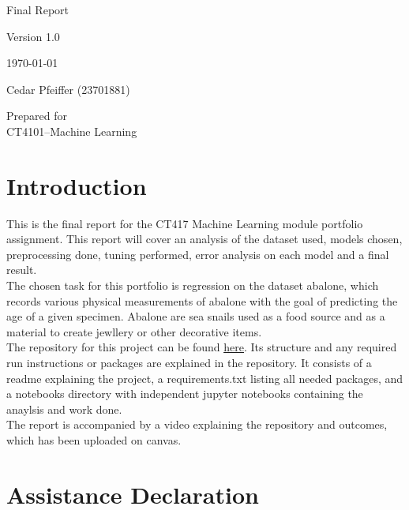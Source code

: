 \documentclass[a4paper, 12pt]{article}
\begin{document}

\begin{titlepage}
    \centering
    \vspace*{4cm}
    {\Large Final Report  \par}
    \vspace{0.5cm}
    {\Large Version 1.0 \par}
    \vspace{0.5cm}
    {\Large \today \par}
    \vspace{2cm}
    {\Large Cedar Pfeiffer (23701881)\par}
    \vfill

    Prepared for\\
    CT4101--Machine Learning\par

\end{titlepage}

\newpage 

\tableofcontents

\newpage


\section{Introduction}
This is the final report for the CT417 Machine Learning module portfolio assignment.
This report will cover an analysis of the dataset used, models chosen, preprocessing done, tuning performed, error analysis on each model and a final result.\\
The chosen task for this portfolio is regression on the dataset abalone\cite{abalone}, which records various physical measurements of abalone with the goal of predicting the age of a given specimen. Abalone are sea snails used as a food source and as a material to create jewllery or other decorative items.\\
The repository for this project can be found \underline{\href{https://github.com/queersweetpotato/machine-learning}{here}}. Its structure and any required run instructions or packages are explained in the repository. It consists of a readme explaining the project, a requirements.txt listing all needed packages, and a notebooks directory with independent jupyter notebooks containing the anaylsis and work done.\\
The report is accompanied by a video explaining the repository and outcomes, which has been uploaded on canvas.

\section{Assistance Declaration}
\end{document}
